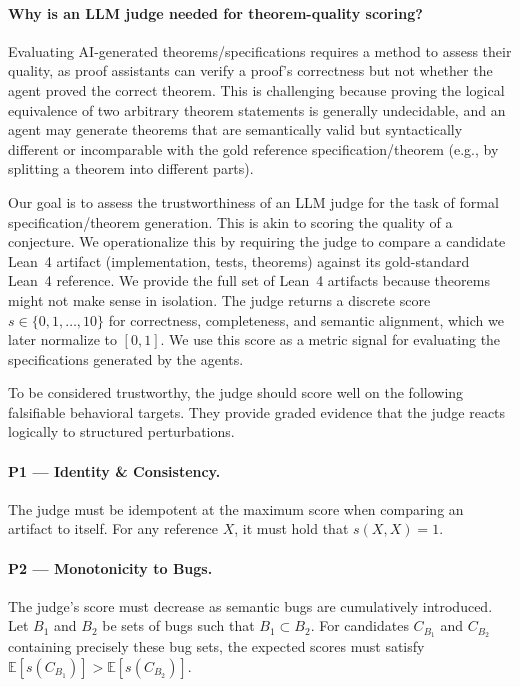 \documentclass{article}
\begin{document}
\paragraph{Why is an LLM judge needed for theorem-quality scoring?}
Evaluating AI-generated theorems/specifications requires a method to assess their quality, as proof assistants can verify a proof's correctness but not whether the agent proved the correct theorem.
This is challenging because proving the logical equivalence of two arbitrary theorem statements is generally undecidable, and an agent may generate theorems that are semantically valid but syntactically different or incomparable with the gold reference specification/theorem (e.g., by splitting a theorem into different parts).

Our goal is to assess the trustworthiness of an LLM judge for the task of formal specification/theorem generation.
This is akin to scoring the quality of a conjecture.
We operationalize this by requiring the judge to compare a candidate Lean~4 artifact (implementation, tests, theorems) against its gold-standard Lean~4 reference.
We provide the full set of Lean~4 artifacts because theorems might not make sense in isolation.
The judge returns a discrete score $s\in\{0,1,\dots,10\}$ for correctness, completeness, and semantic alignment, which we later normalize to $[0,1]$.
We use this score as a metric signal for evaluating the specifications generated by the agents.

To be considered trustworthy, the judge should score well on the following falsifiable behavioral targets.
They provide graded evidence that the judge reacts logically to structured perturbations.

\paragraph{P1 — Identity \& Consistency.}
The judge must be idempotent at the maximum score when comparing an artifact to itself.
For any reference $X$, it must hold that $s(X,X)=1$.

\paragraph{P2 — Monotonicity to Bugs.}
The judge’s score must decrease as semantic bugs are cumulatively introduced. Let $B_1$ and $B_2$ be sets of bugs such that $B_1 \subset B_2$. For candidates $C_{B_1}$ and $C_{B_2}$ containing precisely these bug sets, the expected scores must satisfy $\mathbb{E}[s(C_{B_1})] > \mathbb{E}[s(C_{B_2})]$.
\end{document}
